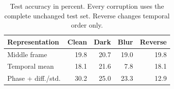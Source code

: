\begin{table}[t]
\centering\small
\begin{tabular}{lrrrr}
\toprule
Representation & Clean & Dark & Blur & Reverse \\
\midrule
Middle frame & 19.8 & 20.7 & 19.0 & 19.8 \\
Temporal mean & 18.1 & 21.6 & 7.8 & 18.1 \\
Phase + diff./std. & 30.2 & 25.0 & 23.3 & 12.9 \\
\bottomrule
\end{tabular}
\caption{Test accuracy in percent. Every corruption uses the complete unchanged test set. Reverse changes temporal order only.}
\label{tab:robust}
\end{table}
